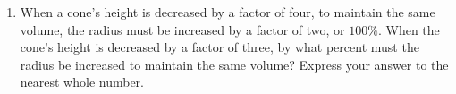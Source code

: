 \documentclass{article}
\begin{document}
\begin{multicols}{2}
\begin{enumerate}
\begin{center}
            \end{center}
            \vspace{3cm}
        \item When a cone's height is decreased by a factor of four, to maintain the same volume, the radius must be increased by a factor of two, or $100\%$.
            When the cone's height is decreased by a factor of three, by what percent must the radius be increased to maintain the same volume?
            Express your answer to the nearest whole number.
            \vspace{3cm}
    \end{enumerate}
\end{multicols}
\end{document}
